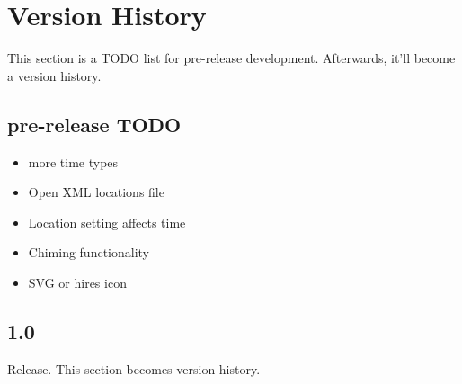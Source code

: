 \section{Version History}

This section is a TODO list for pre-release development. Afterwards, it'll become a version history.

\subsection{pre-release TODO}
\begin{itemize}
    \item more time types
    \item Open XML locations file
    \item Location setting affects time
    \item Chiming functionality
    \item SVG or hires icon
\end{itemize}
\subsection{1.0}

Release. This section becomes version history.

